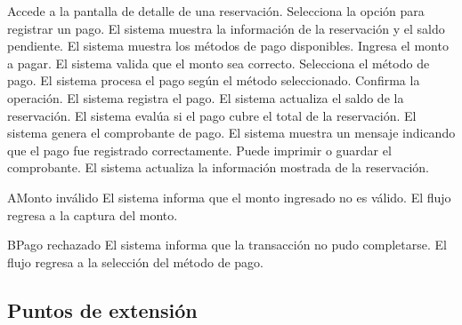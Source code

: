 \begin{UCtrayectoria}
	\UCpaso[\UCactor] Accede a la pantalla de detalle de una reservación.
	\UCpaso[\UCactor] Selecciona la opción para registrar un pago.
	\UCpaso El sistema muestra la información de la reservación y el saldo pendiente.
	\UCpaso El sistema muestra los métodos de pago disponibles.
	\UCpaso[\UCactor] Ingresa el monto a pagar.
	\UCpaso El sistema valida que el monto sea correcto.
	\UCpaso[\UCactor] Selecciona el método de pago.
	\UCpaso El sistema procesa el pago según el método seleccionado.
	\UCpaso[\UCactor] Confirma la operación.
	\UCpaso El sistema registra el pago.
	\UCpaso El sistema actualiza el saldo de la reservación.
	\UCpaso El sistema evalúa si el pago cubre el total de la reservación.
	\UCpaso El sistema genera el comprobante de pago.
	\UCpaso El sistema muestra un mensaje indicando que el pago fue registrado correctamente.
	\UCpaso[\UCactor] Puede imprimir o guardar el comprobante.
	\UCpaso El sistema actualiza la información mostrada de la reservación.
\end{UCtrayectoria}

\begin{UCtrayectoriaA}{A}{Monto inválido}
	\UCpaso El sistema informa que el monto ingresado no es válido.
	\UCpaso El flujo regresa a la captura del monto.
\end{UCtrayectoriaA}

\begin{UCtrayectoriaA}{B}{Pago rechazado}
	\UCpaso El sistema informa que la transacción no pudo completarse.
	\UCpaso El flujo regresa a la selección del método de pago.
\end{UCtrayectoriaA}

\subsection{Puntos de extensión}

